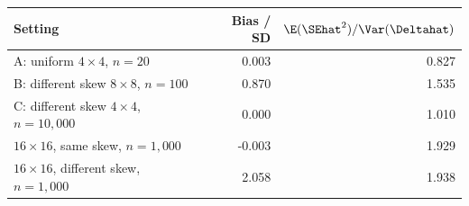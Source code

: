 \begin{tabular}{@{}lrr@{}}
\toprule
Setting & Bias / SD & \(\E(\SEhat^2)/\Var(\Deltahat)\)\\
\midrule
A: uniform \(4\times4\), \(n=20\) & 0.003 & 0.827\\
B: different skew \(8\times8\), \(n=100\) & 0.870 & 1.535\\
C: different skew \(4\times4\), \(n=10{,}000\) & 0.000 & 1.010\\
\(16\times16\), same skew, \(n=1{,}000\) & -0.003 & 1.929\\
\(16\times16\), different skew, \(n=1{,}000\) & 2.058 & 1.938\\
\bottomrule
\end{tabular}
